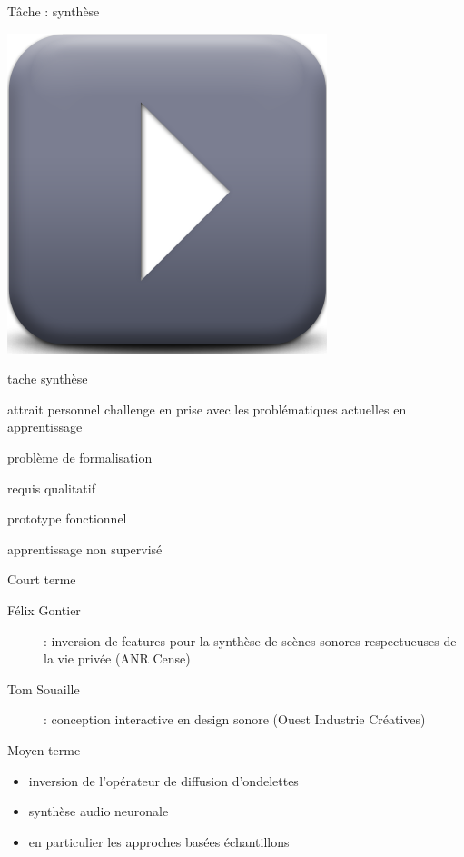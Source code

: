 \begin{frame}{\alert{Tâche} : synthèse}
\begin{center}
\includegraphics[width=.3\columnwidth]{figures/play}
\end{center}
\end{frame}

tache synthèse

attrait personnel
challenge
en prise avec les problématiques actuelles en apprentissage

problème de formalisation

requis qualitatif

prototype fonctionnel

apprentissage non supervisé


\begin{frame}{Court terme}
\begin{description}
\item[Félix Gontier]: inversion de features pour la synthèse de scènes sonores respectueuses de la vie privée (ANR Cense)
\item[Tom Souaille]: conception interactive en design sonore (Ouest Industrie Créatives)
\end{description}
\end{frame}

\begin{frame}{Moyen terme}
\begin{itemize}
\item inversion de l'opérateur de diffusion d'ondelettes
\item synthèse audio neuronale
\item en particulier les approches basées échantillons
\end{itemize}
\end{frame}

